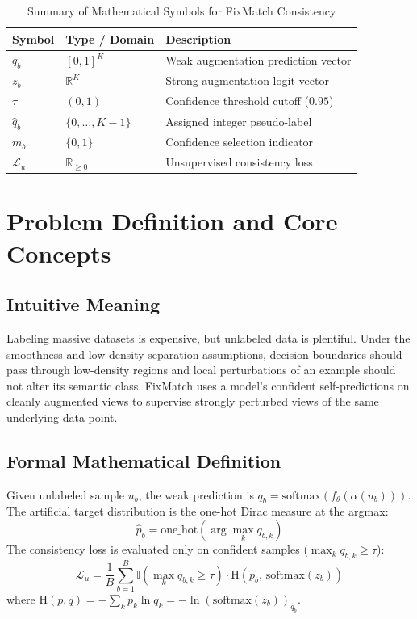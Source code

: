 \documentclass[11pt,a4paper]{article}
\theoremstyle{definition}
\begin{document}
\begin{table}[h]
\centering
\caption{Summary of Mathematical Symbols for FixMatch Consistency}
\begin{tabular}{lll}
\toprule
\textbf{Symbol} & \textbf{Type / Domain} & \textbf{Description} \\
\midrule
$q_b$ & $[0, 1]^K$ & Weak augmentation prediction vector \\
$z_b$ & $\mathbb{R}^K$ & Strong augmentation logit vector \\
$\tau$ & $(0, 1)$ & Confidence threshold cutoff ($0.95$) \\
$\hat{q}_b$ & $\{0, \dots, K-1\}$ & Assigned integer pseudo-label \\
$m_b$ & $\{0, 1\}$ & Confidence selection indicator \\
$\mathcal{L}_u$ & $\mathbb{R}_{\ge 0}$ & Unsupervised consistency loss \\
\bottomrule
\end{tabular}
\end{table}

\section{Problem Definition and Core Concepts}

\subsection{Intuitive Meaning}
Labeling massive datasets is expensive, but unlabeled data is plentiful. Under the smoothness and low-density separation assumptions, decision boundaries should pass through low-density regions and local perturbations of an example should not alter its semantic class. FixMatch uses a model's confident self-predictions on cleanly augmented views to supervise strongly perturbed views of the same underlying data point.

\subsection{Formal Mathematical Definition}
Given unlabeled sample $u_b$, the weak prediction is $q_b = \text{softmax}(f_\theta(\alpha(u_b)))$.
The artificial target distribution is the one-hot Dirac measure at the argmax:
\begin{equation}
\hat{p}_b = \text{one\_hot}(\arg\max_{k} q_{b, k})
\end{equation}
The consistency loss is evaluated only on confident samples ($\max_k q_{b, k} \ge \tau$):
\begin{equation}
\mathcal{L}_u = \frac{1}{B} \sum_{b=1}^B \mathbb{I}\left( \max_k q_{b, k} \ge \tau \right) \cdot \text{H}\left( \hat{p}_b, \, \text{softmax}(z_b) \right)
\end{equation}
where $\text{H}(p, q) = -\sum_k p_k \ln q_k = -\ln (\text{softmax}(z_b))_{\hat{q}_b}$.
\end{document}
